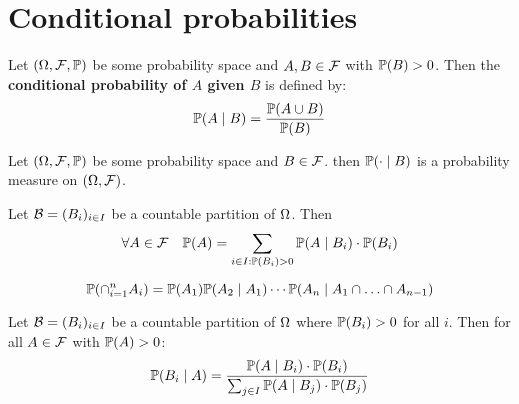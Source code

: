 \section{Conditional probabilities}

\begin{definition*}
  Let \((\O, \F, \P)\) be some probability space and \(A, B \in \F\) with \(\P(B) > 0\). Then the \textbf{conditional probability of \(A\) given \(B\)} is defined by:
  \[\P(A \mid B) = \frac{\P(A \cup B)}{\P(B)}\]
\end{definition*}

\begin{proposition}
  Let \((\O, \F, \P)\) be some probability space and \(B \in \F\). then \(\P(\cdot \mid B)\) is a probability measure on \((\O, \F)\).
\end{proposition}

\begin{theorem*}
  Let \(\B = (B_i)_{i \in I}\) be a countable partition of \(\O\). Then
  \[\forall A \in \F \quad \P(A) = \sum_{i \in I: \P(B_i) > 0} \P(A \mid B_i) \cdot \P(B_i)\]
\end{theorem*}

\begin{theorem*} \vspace{-5pt}
 \[ \P(\cap_{i=1}^n A_i) = \P(A_1) \P(A_2 \mid A_1) \cdots \P(A_n \mid A_1 \cap \ldots \cap A_{n-1})\]
\end{theorem*}

\begin{theorem*}
  Let \(\B = (B_i)_{i \in I}\) be a countable partition of \(\O\) where \(\P(B_i) > 0\) for all \(i\). Then for all \(A \in \F\) with \(\P(A) > 0\):
  \[\P(B_i \mid A) = \frac{\P(A \mid B_i) \cdot \P(B_i)}{\sum_{j \in I} \P(A \mid B_j) \cdot \P(B_j)}\]
\end{theorem*}

